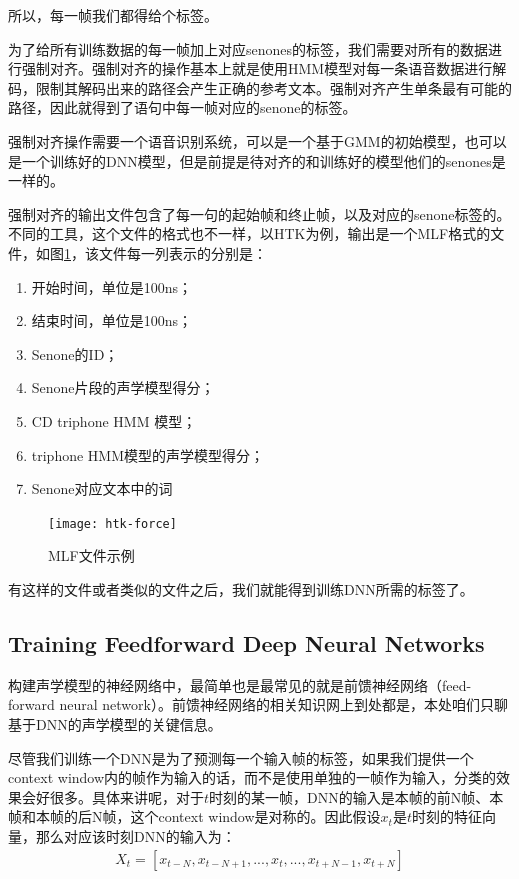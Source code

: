所以，每一帧我们都得给个标签。

为了给所有训练数据的每一帧加上对应senones的标签，我们需要对所有的数据进行强制对齐。强制对齐的操作基本上就是使用HMM模型对每一条语音数据进行解码，限制其解码出来的路径会产生正确的参考文本。强制对齐产生单条最有可能的路径，因此就得到了语句中每一帧对应的senone的标签。

强制对齐操作需要一个语音识别系统，可以是一个基于GMM的初始模型，也可以是一个训练好的DNN模型，但是前提是待对齐的和训练好的模型他们的senones是一样的。

强制对齐的输出文件包含了每一句的起始帧和终止帧，以及对应的senone标签的。不同的工具，这个文件的格式也不一样，以HTK为例，输出是一个MLF格式的文件，如图\ref{fig:htk-force}，该文件每一列表示的分别是：
\begin{enumerate}
  \item 开始时间，单位是100ns；
  \item 结束时间，单位是100ns；
  \item Senone的ID；
  \item Senone片段的声学模型得分；
  \item CD triphone HMM 模型；
  \item triphone HMM模型的声学模型得分；
  \item Senone对应文本中的词
\end{enumerate}

\begin{figure}[htbp]
  \centering
  \texttt{[image: htk-force]}
  \caption{MLF文件示例\label{fig:htk-force}}
\end{figure}

有这样的文件或者类似的文件之后，我们就能得到训练DNN所需的标签了。

\subsection{Training Feedforward Deep Neural Networks} 
构建声学模型的神经网络中，最简单也是最常见的就是前馈神经网络（feed-forward neural network）。前馈神经网络的相关知识网上到处都是，本处咱们只聊基于DNN的声学模型的关键信息。

尽管我们训练一个DNN是为了预测每一个输入帧的标签，如果我们提供一个context window内的帧作为输入的话，而不是使用单独的一帧作为输入，分类的效果会好很多。具体来讲呢，对于$t$时刻的某一帧，DNN的输入是本帧的前N帧、本帧和本帧的后N帧，这个context window是对称的。因此假设$x_t$是$t$时刻的特征向量，那么对应该时刻DNN的输入为：
\begin{align} 
  X_{t} = [x_{t-N}, x_{t-N+1}, ..., x_{t}, ..., x_{t+N-1}, x_{t+N}]
\end{align}

